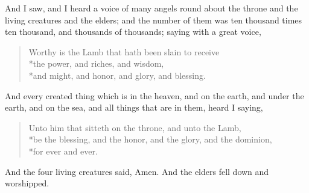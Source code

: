  And I saw, and I heard a voice of many angels round about the throne and the living creatures and the elders; and the number of them was ten thousand times ten thousand, and thousands of thousands;%
 saying with a great voice,
\begin{verse}
Worthy is the Lamb that hath been slain to receive\\*\vin the power, and riches, and wisdom,\\*\vin and might, and honor, and glory, and blessing.
\end{verse}
 And every created thing which is in the heaven, and on the earth, and under the earth, and on the sea, and all things that are in them, heard I saying,
\begin{verse}
Unto him that sitteth on the throne, and unto the Lamb,\\*\vin be the blessing, and the honor, and the glory, and the dominion,\\*\vin for ever and ever.
\end{verse}
 And the four living creatures said, Amen. And the elders fell down and worshipped.